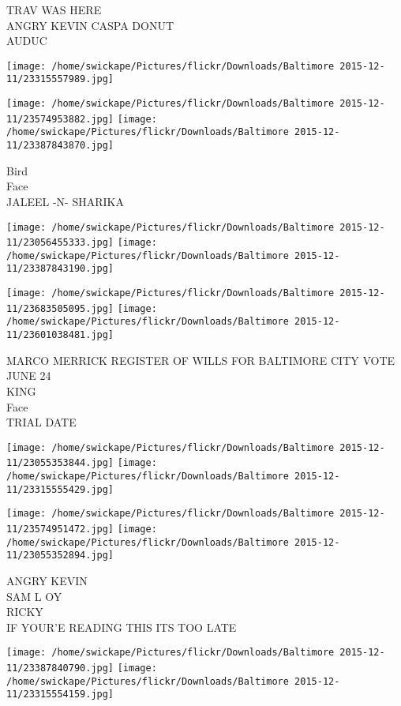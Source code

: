 \documentclass[10pt,letterpaper]{article}
\begin{document}
TRAV WAS HERE\\
ANGRY KEVIN CASPA DONUT\\
AUDUC
\pagebreak

\texttt{[image: /home/swickape/Pictures/flickr/Downloads/Baltimore 2015-12-11/23315557989.jpg]}

\vspace{0.25in}
\texttt{[image: /home/swickape/Pictures/flickr/Downloads/Baltimore 2015-12-11/23574953882.jpg]}
\texttt{[image: /home/swickape/Pictures/flickr/Downloads/Baltimore 2015-12-11/23387843870.jpg]}

Bird\\
Face\\
JALEEL {-}N{-} SHARIKA
\pagebreak

\texttt{[image: /home/swickape/Pictures/flickr/Downloads/Baltimore 2015-12-11/23056455333.jpg]}
\texttt{[image: /home/swickape/Pictures/flickr/Downloads/Baltimore 2015-12-11/23387843190.jpg]}

\texttt{[image: /home/swickape/Pictures/flickr/Downloads/Baltimore 2015-12-11/23683505095.jpg]}
\texttt{[image: /home/swickape/Pictures/flickr/Downloads/Baltimore 2015-12-11/23601038481.jpg]}

MARCO MERRICK REGISTER OF WILLS FOR BALTIMORE CITY VOTE JUNE 24\\
KING\\
Face\\
TRIAL DATE
\pagebreak

\texttt{[image: /home/swickape/Pictures/flickr/Downloads/Baltimore 2015-12-11/23055353844.jpg]}
\texttt{[image: /home/swickape/Pictures/flickr/Downloads/Baltimore 2015-12-11/23315555429.jpg]}

\texttt{[image: /home/swickape/Pictures/flickr/Downloads/Baltimore 2015-12-11/23574951472.jpg]}
\texttt{[image: /home/swickape/Pictures/flickr/Downloads/Baltimore 2015-12-11/23055352894.jpg]}

ANGRY KEVIN\\
SAM L OY\\
RICKY\\
IF YOUR'E READING THIS ITS TOO LATE
\pagebreak

\texttt{[image: /home/swickape/Pictures/flickr/Downloads/Baltimore 2015-12-11/23387840790.jpg]}
\texttt{[image: /home/swickape/Pictures/flickr/Downloads/Baltimore 2015-12-11/23315554159.jpg]}
\end{document}
